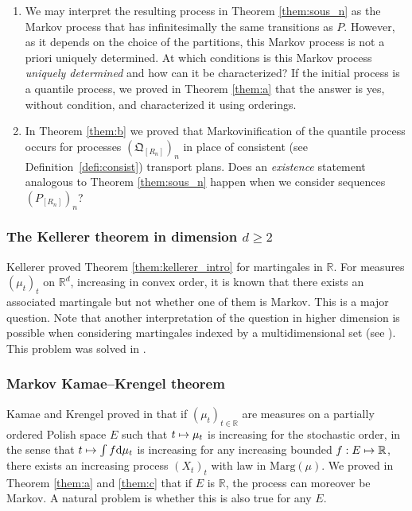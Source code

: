 \documentclass[JEP,XML,SOM,Unicode,NoEqCountersInSection,NoFloatCountersInSection,published]{cedram}
\newcommand\mto{\mathchoice{\longmapsto}{\mapsto}{\mapsto}{\mapsto}}
\theoremstyle{plain}
\theoremstyle{definition}
\newcommand{\dd}{\mathrm{d}}
\newcommand{\como}{\mathfrak{Q}}
\newcommand{\ma}{\mathrm{Marg}}
\newcommand{\R}{\mathbb{R}}
\begin{document}

\label{ss:marko}
\begin{enumerate}
\item
We may interpret the resulting process in Theorem \ref{them:sous_n} as the Markov process that has infinitesimally the same transitions as $P$. However, as it depends on the choice of the partitions, this Markov process is not a priori uniquely determined. At which conditions is this Markov process \emph{uniquely determined} and how can it be characterized? If the initial process is a quantile process, we proved in Theorem \ref{them:a} that the answer is yes, without condition, and characterized it using orderings.

\item
In Theorem \ref{them:b} we proved that Markovinification of the quantile process occurs for processes $(\como_{[R_n]})_n$ in place of consistent (see Definition\ \ref{defi:consist}) transport plans. Does an \emph{existence} statement analogous to Theorem \ref{them:sous_n} happen when we consider sequences $(P_{[R_n]})_{n}$?\enlargethispage{.5\baselineskip}%
\end{enumerate}

\subsubsection{The Kellerer theorem in dimension $d\geq 2$}\label{ss:Kel_dimsup}
Kellerer proved Theorem \ref{them:kellerer_intro} for martingales in $\R$. For measures $(\mu_t)_t$ on $\R^d$, increasing in convex order, it is known that there exists an associated martingale \cite{HiRo13,BHS} but not whether one of them is Markov. This is a major question. Note that another interpretation of the question in higher dimension is possible when considering martingales indexed by a multidimensional set (see \cite[Prob.\,7b]{HPRY}). This problem was solved in \cite{Ju_seminaire}.

\subsubsection{Markov Kamae--Krengel theorem}\label{ss:marko_kk}
Kamae and Krengel proved in \cite{KaKr} that if $(\mu_t)_{t\in \R}$ are measures on a partially ordered Polish space $E$ such that $t\mto\mu_t$ is increasing for the stochastic order, in the sense that $t\mto \int f\dd\mu_t$ is increasing for any increasing bounded $f:E\mto \R$, there exists an increasing process $(X_t)_t$ with law in $\ma(\mu)$. We proved in Theorem \ref{them:a} and \ref{them:c} that if $E$ is $\R$, the process can moreover be Markov. A natural problem is whether this is also true for any $E$.
\end{document}
